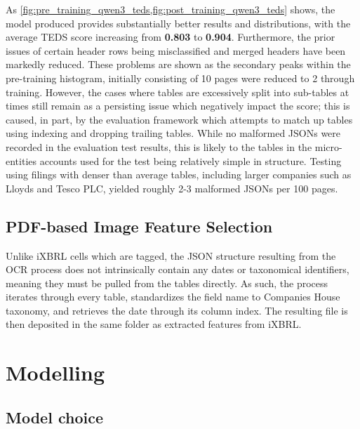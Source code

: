 \documentclass[ %
                    author={Natchalin Iwsakul \\ Inkaphol Siriwongwattana \\ Tanaphan Kummaraphat \\ Patorn Srisupap},
                supervisor={Fernando Moreno-Pino},
                    degree={MSc},
                     title={Propensity Modelling for SME Commercial Lending Using Open Public Data},
                  subtitle={Companies House filings and GDELT media coverage as predictors of first-time borrowing},
                      type={},
                      year={2026}]{dissertation}
\begin{document}
    As \cref{fig:pre_training_qwen3_teds,fig:post_training_qwen3_teds} shows, the model produced provides substantially better results and distributions, with the average TEDS score increasing from \textbf{0.803} to \textbf{0.904}. Furthermore, the prior issues of certain header rows being misclassified and merged headers have been markedly reduced. These problems are shown as the secondary peaks within the pre-training histogram, initially consisting of 10 pages were reduced to 2 through training. However, the cases where tables are excessively split into sub-tables at times still remain as a persisting issue which negatively impact the score; this is caused, in part, by the evaluation framework which attempts to match up tables using indexing and dropping trailing tables.
    While no malformed JSONs were recorded in the evaluation test results, this is likely to the tables in the micro-entities accounts used for the test being relatively simple in structure. Testing using filings with denser than average tables, including larger companies such as Lloyds and Tesco PLC, yielded roughly 2-3 malformed JSONs per 100 pages. 



    
\subsection{PDF-based Image Feature Selection}
Unlike iXBRL cells which are tagged, the JSON structure resulting from the OCR process does not intrinsically contain any dates or taxonomical identifiers, meaning they must be pulled from the tables directly. As such, the process iterates through every table, standardizes the field name to Companies House taxonomy, and retrieves the date through its column index. The resulting file is then deposited in the same folder as extracted features from iXBRL.

\section{Modelling}                            \label{sec:model}

  \subsection{Model choice}


  
\end{document}
